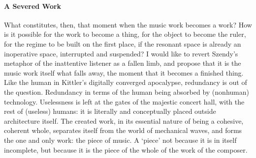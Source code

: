 





\paragraph{A Severed Work}
What constitutes, then, that moment when the music work becomes a work? How is it possible for the work to become a thing, for the object to become the ruler, for the regime to be built on the first place, if the resonant space is already an inoperative space, interrupted and suspended? I would like to revert Szendy's metaphor of the inattentive listener as a fallen limb, and propose that it is the music work itself what falls away, the moment that it becomes a finished thing. Like the human in Kittler's digitally converged apocalypse, redundancy is out of the question. Redundancy in terms of the human being absorbed by (nonhuman) technology. Uselessness is left at the gates of the majestic concert hall, with the rest of (useless) humans: it is literally and conceptually placed outside architecture itself. The created work, in its essential nature of being a cohesive, coherent whole, separates itself from the world of mechanical waves, and forms the one and only work: the piece of music. A `piece' not because it is in itself incomplete, but because it is the piece of the whole of the work of the composer.



